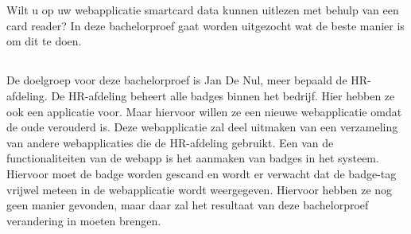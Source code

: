 
\chapter{}%
\label{ch:inleiding}

Wilt u op uw webapplicatie smartcard data kunnen uitlezen met behulp van een card reader? In deze bachelorproef gaat worden uitgezocht wat de beste manier is om dit te doen.




\section{}%
\label{sec:probleemstelling}

De doelgroep voor deze bachelorproef is Jan De Nul, meer bepaald de HR-afdeling. De HR-afdeling beheert alle badges binnen het bedrijf. Hier hebben ze ook een applicatie voor. Maar hiervoor willen ze een nieuwe webapplicatie omdat de oude verouderd is. Deze webapplicatie zal deel uitmaken van een verzameling van andere webapplicaties die de HR-afdeling gebruikt. Een van de functionaliteiten van de webapp is het aanmaken van badges in het systeem. Hiervoor moet de badge worden gescand en wordt er verwacht dat de badge-tag vrijwel meteen in de webapplicatie wordt weergegeven. Hiervoor hebben ze nog geen manier gevonden, maar daar zal het resultaat van deze bachelorproef verandering in moeten brengen.

